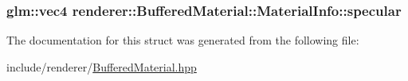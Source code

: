 \hypertarget{structrenderer_1_1BufferedMaterial_1_1MaterialInfo_a2d764c23541048f55a4cba7e8615ee1f}{
\subsubsection[{specular}]{\setlength{\rightskip}{0pt plus 5cm}glm\-::vec4 renderer\-::\-Buffered\-Material\-::\-Material\-Info\-::specular}}\label{structrenderer_1_1BufferedMaterial_1_1MaterialInfo_a2d764c23541048f55a4cba7e8615ee1f}


The documentation for this struct was generated from the following file\-:\begin{DoxyCompactItemize}
\item 
include/renderer/\hyperlink{BufferedMaterial_8hpp}{Buffered\-Material.\-hpp}\end{DoxyCompactItemize}
